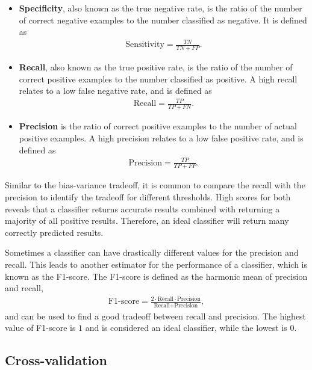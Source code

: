 \begin{itemize}

\item \textbf{Specificity}, also known as the true negative rate, is the ratio of the number of correct negative examples to the number classified as negative. It is defined as
\begin{align}
\text{Sensitivity} = \frac{TN}{TN + FP}.
\end{align}

\item \textbf{Recall}, also known as the true positive rate, is the ratio of the number of correct positive examples to the number classified as positive. A high recall relates to a low false negative rate, and is defined as
\begin{align}
\text{Recall} = \frac{TP}{TP + FN}.
\end{align}

\item \textbf{Precision} is the ratio of correct positive examples to the number of actual positive examples. A high precision relates to a low false positive rate, and is defined as  \\
\begin{align}
\text{Precision} = \frac{TP}{TP + FP}.
\end{align}
\end{itemize}

Similar to the bias-variance tradeoff, it is common to compare the recall with the precision to identify the tradeoff for different thresholds. High scores for both reveals that a classifier returns accurate results combined with returning a majority of all positive results. Therefore, an ideal classifier will return many correctly predicted results.

Sometimes a classifier can have drastically different values for the precision and recall. This leads to another estimator for the performance of a classifier, which is known as the F1-score. The F1-score is defined as the harmonic mean of precision and recall,
\begin{align*}
\text{F1-score} = \frac{2\cdot \text{Recall} \cdot \text{Precision}}{\text{Recall} + \text{Precision}},
\end{align*}
and can be used to find a good tradeoff between recall and precision. The highest value of F1-score is $1$ and is considered an ideal classifier, while the lowest is $0$.

\subsection{Cross-validation}


